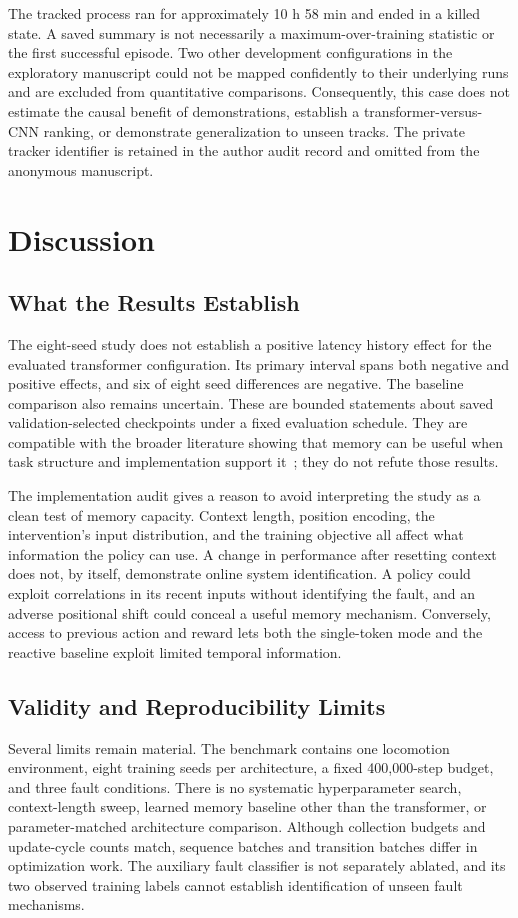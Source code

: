 \documentclass[runningheads]{llncs}
\begin{document}
The tracked process ran for approximately 10 h 58 min and ended in a killed state. A saved summary is not necessarily a maximum-over-training statistic or the first successful episode. Two other development configurations in the exploratory manuscript could not be mapped confidently to their underlying runs and are excluded from quantitative comparisons. Consequently, this case does not estimate the causal benefit of demonstrations, establish a transformer-versus-CNN ranking, or demonstrate generalization to unseen tracks. The private tracker identifier is retained in the author audit record and omitted from the anonymous manuscript.

\section{Discussion}
\subsection{What the Results Establish}
The eight-seed study does not establish a positive latency history effect for the evaluated transformer configuration. Its primary interval spans both negative and positive effects, and six of eight seed differences are negative. The baseline comparison also remains uncertain. These are bounded statements about saved validation-selected checkpoints under a fixed evaluation schedule. They are compatible with the broader literature showing that memory can be useful when task structure and implementation support it~\cite{ni,amago}; they do not refute those results.

The implementation audit gives a reason to avoid interpreting the study as a clean test of memory capacity. Context length, position encoding, the intervention's input distribution, and the training objective all affect what information the policy can use. A change in performance after resetting context does not, by itself, demonstrate online system identification. A policy could exploit correlations in its recent inputs without identifying the fault, and an adverse positional shift could conceal a useful memory mechanism. Conversely, access to previous action and reward lets both the single-token mode and the reactive baseline exploit limited temporal information.

\subsection{Validity and Reproducibility Limits}
Several limits remain material. The benchmark contains one locomotion environment, eight training seeds per architecture, a fixed 400,000-step budget, and three fault conditions. There is no systematic hyperparameter search, context-length sweep, learned memory baseline other than the transformer, or parameter-matched architecture comparison. Although collection budgets and update-cycle counts match, sequence batches and transition batches differ in optimization work. The auxiliary fault classifier is not separately ablated, and its two observed training labels cannot establish identification of unseen fault mechanisms.
\end{document}
